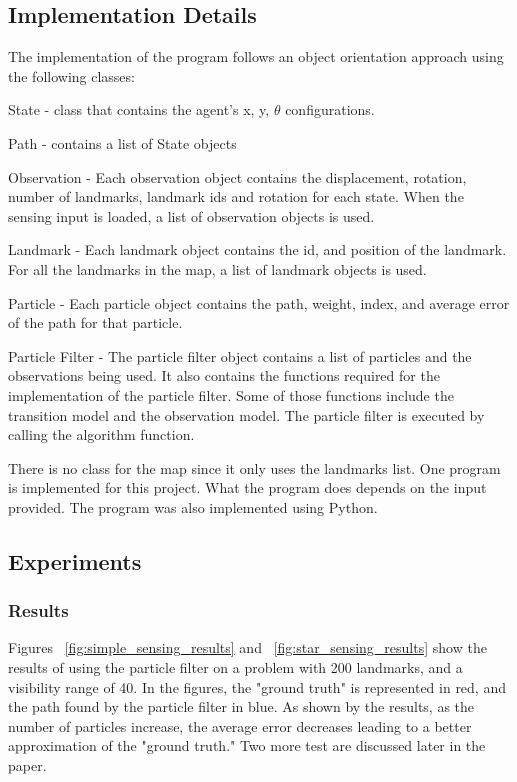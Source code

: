 \documentclass[a4paper,11pt]{report}
\begin{document}
	\subsection{Implementation Details}
	The implementation of the program follows an object orientation approach using the following classes:
	
		State - class that contains the agent's x, y, $\theta$ configurations.
	
		Path - contains a list of State objects
	
		Observation - Each observation object contains the displacement, rotation, number of landmarks, landmark ids and rotation for each state. When the sensing input is loaded, a list of observation objects is used.
	
		Landmark - Each landmark object contains the id, and position of the landmark. For all the landmarks in the map, a list of landmark objects is used.
	
		Particle - Each particle object contains the path, weight, index, and average error of the path for that particle.
	
		Particle Filter - The particle filter object contains a list of particles and the observations being used. It also contains the functions required for the implementation of the particle filter. Some of those functions include the transition model and the observation model. The particle filter is executed by calling the algorithm function.
		
	There is no class for the map since it only uses the landmarks list. One program is implemented for this project. What the program does depends on the input provided. The program was also implemented using Python.
		
		

	\subsection{Experiments}


		\subsubsection{Results}
		Figures ~\ref{fig:simple_sensing_results} and ~\ref{fig:star_sensing_results} show the results of using the particle filter on a problem with 200 landmarks, and a visibility range of 40. In the figures, the "ground truth" is represented in red, and the path found by the particle filter in blue. As shown by the results, as the number of particles increase, the average error decreases leading to a better approximation of the "ground truth." Two more test are discussed later in the paper.
		
\end{document}
